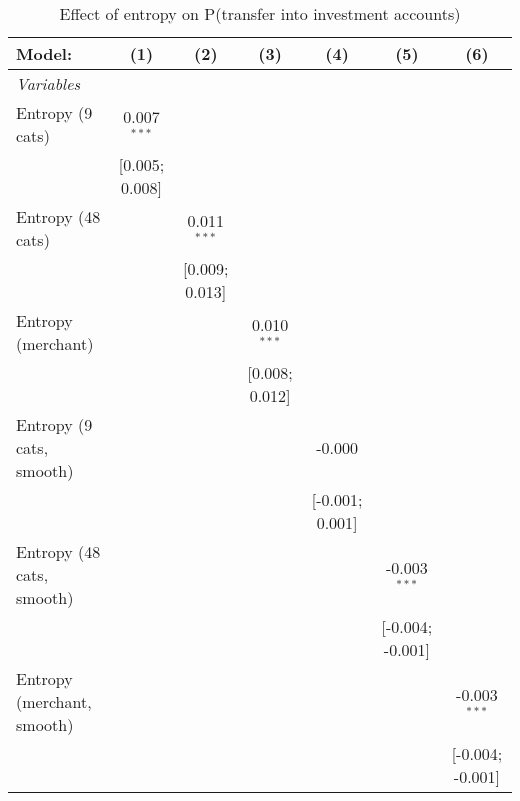 
\begin{table}[htbp]
   \centering
   \tiny
   \begin{threeparttable}[b]
      \caption{\label{tab:reg_has_investments_main} Effect of entropy on P(transfer into investment accounts)}
      \begin{tabular}{lcccccc}
         \tabularnewline \midrule \midrule
         Model:                     & (1)            & (2)            & (3)            & (4)             & (5)              & (6)\\  
         \midrule
         \emph{Variables}\\
         Entropy (9 cats)           & 0.007$^{***}$  &                &                &                 &                  &   \\   
                                    & [0.005; 0.008] &                &                &                 &                  &   \\   
         Entropy (48 cats)          &                & 0.011$^{***}$  &                &                 &                  &   \\   
                                    &                & [0.009; 0.013] &                &                 &                  &   \\   
         Entropy (merchant)         &                &                & 0.010$^{***}$  &                 &                  &   \\   
                                    &                &                & [0.008; 0.012] &                 &                  &   \\   
         Entropy (9 cats, smooth)   &                &                &                & -0.000          &                  &   \\   
                                    &                &                &                & [-0.001; 0.001] &                  &   \\   
         Entropy (48 cats, smooth)  &                &                &                &                 & -0.003$^{***}$   &   \\   
                                    &                &                &                &                 & [-0.004; -0.001] &   \\   
         Entropy (merchant, smooth) &                &                &                &                 &                  & -0.003$^{***}$\\   
                                    &                &                &                &                 &                  & [-0.004; -0.001]\\   

\end{tabular}
\end{threeparttable}
\end{table}
